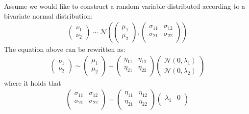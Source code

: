 \begin{example}
	Assume we would like to construct a random variable distributed according to a bivariate normal distribution:
	\begin{align*}
		\begin{pmatrix} \nu_1 \\ \nu_2 \end{pmatrix}
		\sim
		\mathcal{N}\left(
		\begin{pmatrix}
				\mu_1 \\  \mu_2
			\end{pmatrix}
		,
		\begin{pmatrix}
				\sigma_{11} & \sigma_{12} \\
				\sigma_{21} & \sigma_{22} \\
			\end{pmatrix}
		\right)
	\end{align*}
	The equation above can be rewritten as:
	\begin{align*}
		\begin{pmatrix} \nu_1 \\ \nu_2 \end{pmatrix}
		\sim
		\begin{pmatrix}
			\mu_1 \\  \mu_2
		\end{pmatrix}
		+
		\begin{pmatrix}
			\eta_{11} & \eta_{12} \\
			\eta_{21} & \eta_{22} \\
		\end{pmatrix}
		\begin{pmatrix}
			\mathcal{N}(0, \lambda_1) \\
			\mathcal{N}(0, \lambda_2)
		\end{pmatrix}
	\end{align*}
	where it holds that
	\begin{align*}
		\begin{pmatrix}
			\sigma_{11} & \sigma_{12} \\
			\sigma_{21} & \sigma_{22} \\
		\end{pmatrix}
		=
		\begin{pmatrix}
			\eta_{11} & \eta_{12} \\
			\eta_{21} & \eta_{22} \\
		\end{pmatrix}
		\begin{pmatrix}
			\lambda_1 & 0         \\

\end{pmatrix}
\end{align*}
\end{example}
